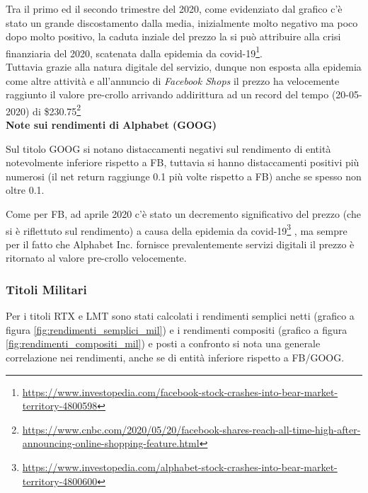 \documentclass{article}
\begin{document}
Tra il primo ed il secondo trimestre del 2020, come evidenziato dal grafico c'è stato un grande discostamento dalla media, inizialmente molto negativo ma poco dopo molto positivo,
la caduta inziale del prezzo la si può attribuire alla crisi finanziaria del 2020, scatenata dalla epidemia da 
covid-19\footnote{
  \href{https://www.investopedia.com/facebook-stock-crashes-into-bear-market-territory-4800598}{https://www.investopedia.com/facebook-stock-crashes-into-bear-market-territory-4800598}
}.\\
Tuttavia grazie alla natura digitale del servizio, dunque non esposta alla epidemia come altre attività e all'annuncio di \emph{Facebook Shops} il prezzo ha velocemente raggiunto il valore pre-crollo arrivando
addirittura ad un record del tempo (20-05-2020) di 
\$230.75\footnote{
  \href{https://www.cnbc.com/2020/05/20/facebook-shares-reach-all-time-high-after-announcing-online-shopping-feature.html}{https://www.cnbc.com/2020/05/20/facebook-shares-reach-all-time-high-after-announcing-online-shopping-feature.html}
}\\

\textbf{Note sui rendimenti di Alphabet (GOOG)}

Sul titolo GOOG si notano distaccamenti negativi sul rendimento di entità notevolmente inferiore rispetto a FB, tuttavia si hanno distaccamenti positivi più numerosi (il net return raggiunge 0.1 più volte rispetto a FB) anche se spesso non oltre 0.1.

Come per FB, ad aprile 2020 c'è stato un decremento significativo del prezzo (che si è riflettuto sul rendimento) a causa della epidemia da 
covid-19\footnote{
  \href{https://www.investopedia.com/alphabet-stock-crashes-into-bear-market-territory-4800600}{https://www.investopedia.com/alphabet-stock-crashes-into-bear-market-territory-4800600}
}
, ma sempre per il fatto che Alphabet Inc. fornisce
prevalentemente servizi digitali il prezzo è ritornato al valore pre-crollo velocemente.

\subsubsection{Titoli Militari}

Per i titoli RTX e LMT sono stati calcolati i rendimenti semplici netti (grafico a figura \ref{fig:rendimenti_semplici_mil}) e i rendimenti compositi (grafico a figura \ref{fig:rendimenti_compositi_mil}) e posti a confronto
si nota una generale correlazione nei rendimenti, anche se di entità inferiore rispetto a FB/GOOG.
\end{document}
